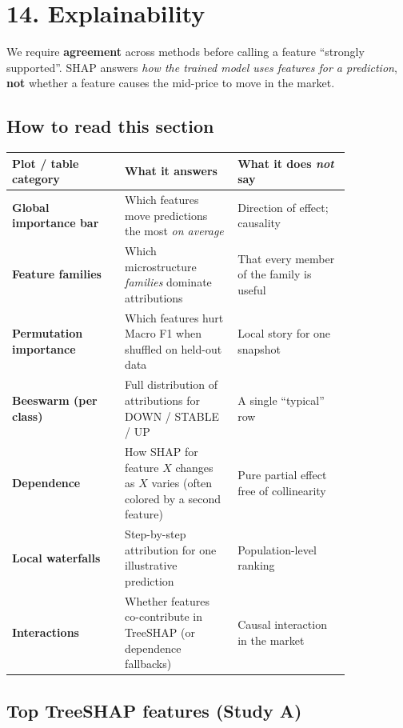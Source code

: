 \documentclass[11pt,a4paper]{article}
\begin{document}
\vspace{0.5em}

\section{14. Explainability}

We require \textbf{agreement} across methods before calling a feature ``strongly supported''. SHAP answers \textit{how the trained model uses features for a prediction}, \textbf{not} whether a feature causes the mid-price to move in the market.


\subsection{How to read this section}

\begin{center}
\begin{tabular}{L{0.28\linewidth}L{0.28\linewidth}L{0.28\linewidth}}
\toprule
Plot / table category & What it answers & What it does \textit{not} say \\
\midrule
\textbf{Global importance bar} & Which features move predictions the most \textit{on average} & Direction of effect; causality \\
\textbf{Feature families} & Which microstructure \textit{families} dominate attributions & That every member of the family is useful \\
\textbf{Permutation importance} & Which features hurt Macro F1 when shuffled on held-out data & Local story for one snapshot \\
\textbf{Beeswarm (per class)} & Full distribution of attributions for DOWN / STABLE / UP & A single ``typical'' row \\
\textbf{Dependence} & How SHAP for feature $X$ changes as $X$ varies (often colored by a second feature) & Pure partial effect free of collinearity \\
\textbf{Local waterfalls} & Step-by-step attribution for one illustrative prediction & Population-level ranking \\
\textbf{Interactions} & Whether features co-contribute in TreeSHAP (or dependence fallbacks) & Causal interaction in the market \\
\bottomrule
\end{tabular}
\end{center}
\vspace{0.35em}

\subsection{Top TreeSHAP features (Study A)}
\end{document}
